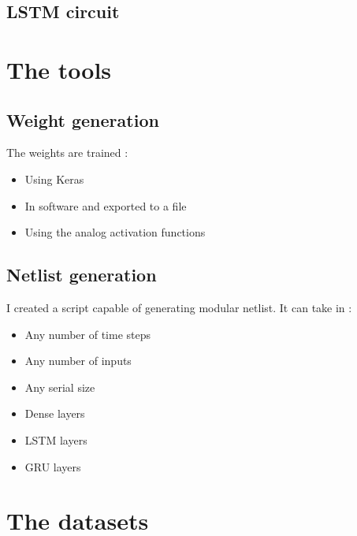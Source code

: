 \documentclass[14pt]{beamer}
\begin{document}
  \subsection{LSTM circuit}

  \begin{frame}{\insertsection}{\insertsubsection}
    \begin{center}
      
    \end{center}
  \end{frame}


  \section{The tools}
  \subsection{Weight generation}
  \begin{frame}{\insertsection}{\insertsubsection}
    The weights are trained :
    \begin{itemize}
      \item Using Keras
      \item In software and exported to a file
      \item Using the analog activation functions
    \end{itemize}
  \end{frame}

  \subsection{Netlist generation}
  \begin{frame}{\insertsection}{\insertsubsection}
    I created a script capable of generating modular netlist. It can take in :
    \begin{itemize}
      \item Any number of time steps
      \item Any number of inputs
      \item Any serial size
      \item Dense layers
      \item LSTM layers
      \item GRU layers
    \end{itemize}
  \end{frame}

  \section{The datasets}
\end{document}
